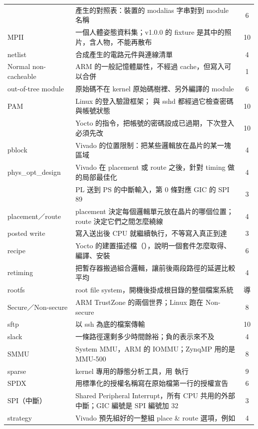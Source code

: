 \begin{xltabular}{\textwidth}{l X c}
 &  產生的對照表：裝置的 modalias 字串對到 module 名稱 & 6 \\
MPII & 一個人體姿態資料集；v1.0.0 的 fixture 是其中的照片，含人物，不能再散布 & 10 \\
netlist & 合成產生的電路元件與連線清單 & 4 \\
Normal non-cacheable & ARM 的一般記憶體屬性，不經過 cache，但寫入可以合併 & 1 \\
out-of-tree module & 原始碼不在 kernel 原始碼樹裡、另外編譯的 module & 6 \\
PAM & Linux 的登入驗證框架； 與 sshd 都經過它檢查密碼與帳號狀態 & 10 \\
 & Yocto  的指令，把帳號的密碼設成已過期，下次登入必須先改 & 10 \\
pblock & Vivado 的位置限制：把某些邏輯放在晶片的某一塊區域 & 4 \\
phys\_opt\_design & Vivado 在 placement 或 route 之後，針對 timing 做的局部最佳化 & 4 \\
 & PL 送到 PS 的中斷輸入，第 0 條對應 GIC 的 SPI 89 & 3 \\
placement／route & placement 決定每個邏輯單元放在晶片的哪個位置；route 決定它們之間怎麼繞線 & 4 \\
posted write & 寫入送出後 CPU 就繼續執行，不等寫入真正到達 & 3 \\
recipe & Yocto 的建置描述檔（），說明一個套件怎麼取得、編譯、安裝 & 6 \\
retiming & 把暫存器搬過組合邏輯，讓前後兩段路徑的延遲比較平均 & 4 \\
rootfs & root file system，開機後掛成根目錄的整個檔案系統 & 導 \\
Secure／Non-secure & ARM TrustZone 的兩個世界；Linux 跑在 Non-secure & 8 \\
sftp & 以 ssh 為底的檔案傳輸 & 10 \\
slack & 一條路徑還剩多少時間餘裕；負的表示來不及 & 4 \\
SMMU & System MMU，ARM 的 IOMMU；ZynqMP 用的是 MMU-500 & 8 \\
sparse & kernel 專用的靜態分析工具，用  執行 & 9 \\
SPDX & 用標準化的授權名稱寫在原始檔第一行的授權宣告 & 6 \\
SPI（中斷） & Shared Peripheral Interrupt，所有 CPU 共用的外部中斷；GIC 編號是 SPI 編號加 32 & 3 \\
strategy & Vivado 預先組好的一整組 place \& route 選項，例如  & 4 \\

\end{xltabular}
